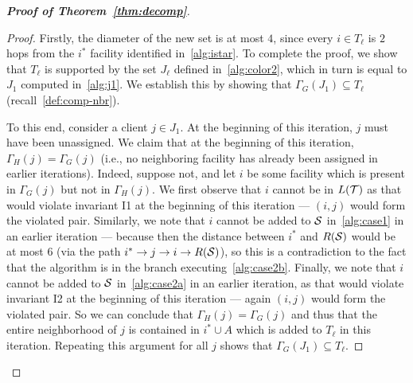 \begin{proof}[{\bf Proof of Theorem~\ref{thm:decomp}}]
\begin{proof}
Firstly, the diameter of the new set is at most $4$, since every $i \in T_\ell$ is $2$ hops from the $i^*$ facility identified in~\cref{alg:istar}. To complete the proof, we show that $T_\ell$ is supported by the set $J_\ell$ defined in~\cref{alg:color2}, which in turn is equal to $J_1$ computed in~\cref{alg:j1}. We establish this by showing that $\Gamma_G(J_1) \subseteq T_\ell$ (recall~\cref{def:comp-nbr}).

To this end, consider a client $j \in J_1$. At the beginning of this iteration, $j$ must have been unassigned. We claim that at the beginning of this iteration, $\Gamma_H(j) = \Gamma_G(j)$ (i.e., no neighboring facility has already been assigned in earlier iterations). Indeed, suppose not, and let $i$ be some facility which is present in $\Gamma_G(j)$ but not in $\Gamma_H(j)$. We first observe that $i$ cannot be in $L({\cal T})$ as that would violate invariant I1 at the beginning of this iteration --- $(i,j)$ would form the violated pair. Similarly, we note that $i$ cannot be added to ${\cal S}$ in~\cref{alg:case1} in an earlier iteration --- because then the distance between $i^*$ and $R({\cal S})$ would be at most $6$ (via the path $i^* \rightarrow j \rightarrow i \rightarrow R({\cal S})$), so this is a contradiction to the fact that the algorithm is in the branch executing~\cref{alg:case2b}. Finally, we note that $i$ cannot be added to ${\cal S}$ in~\cref{alg:case2a} in an earlier iteration, as that would violate invariant I2 at the beginning of this iteration --- again $(i,j)$ would form the violated pair.
So we can conclude that $\Gamma_H(j) = \Gamma_G(j)$ and thus that the entire neighborhood of $j$ is contained in $i^* \cup A$ which is added to $T_\ell$ in this iteration. Repeating this argument for all $j$ shows that $\Gamma_G(J_1) \subseteq T_\ell$.
\end{proof}


\end{proof}
